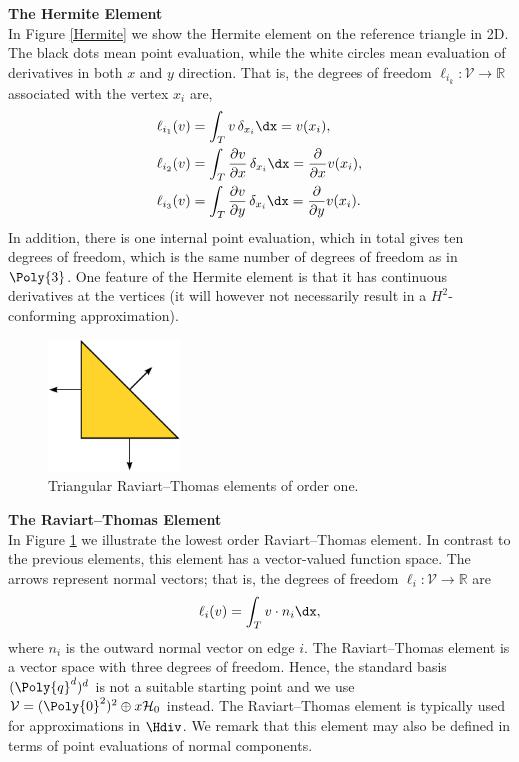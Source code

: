 \begin{example}{\bf{ The Hermite Element}} \\
In Figure \ref{Hermite} we show the Hermite element on the reference
triangle in 2D. The black dots mean point evaluation, while the white
circles mean evaluation of derivatives in both $x$ and $y$ direction.
That is, the degrees of freedom $\ell_{i_k} : \mathcal{V} \rightarrow
\mathbb{R}$ associated with the vertex $x_i$ are,
\begin{align}
\ell_{i_1} (v) &= \int_{T} {v} \, \delta_{x_i} \dx = v(x_i),    \\
\ell_{i_2} (v) &= \int_{T} \frac{\partial{v}}{\partial x} \, \delta_{x_i} \dx = \frac{\partial}{\partial x} v(x_i),  \\
\ell_{i_3} (v) &= \int_{T} \frac{\partial{v}}{\partial y} \, \delta_{x_i} \dx = \frac{\partial}{\partial y} v(x_i).
\end{align}
In addition, there is one internal point evaluation, which in total gives
ten degrees of freedom, which is the same number of degrees of freedom as
in $\Poly{3}$.  One feature of the Hermite element is that it has continuous
derivatives at the vertices (it will however not necessarily result in
a $H^2$-conforming approximation).
\end{example}

\begin{figure}
  \begin{center}
    \includegraphics[height=3.5cm]{chapters/kirby-6/pdf/RT0.pdf}
    \caption{Triangular Raviart--Thomas elements of order one.}
    \label{RaviartThomas}
  \end{center}
\end{figure}

\begin{example}{\bf{The Raviart--Thomas Element}} \\
In Figure \ref{RaviartThomas} we illustrate the lowest order
Raviart--Thomas element.  In contrast to the previous elements, this
element has a vector-valued function space.  The arrows represent normal
vectors; that is, the degrees of freedom $\ell_i : \mathcal{V} \rightarrow
\mathbb{R}$ are
\begin{equation}
\ell_i ( v) = \int_{T} v \cdot n_i  \dx ,
\end{equation}
where $n_i$ is the outward normal vector on edge $i$.  The Raviart--Thomas
element is a vector space with three degrees of freedom. Hence, the
standard basis $(\Poly{q}^d)^d$ is not a suitable starting point and we use
$\mathcal{V} = (\Poly{0}^2)^2 \oplus x \H_0$ instead.  The Raviart--Thomas
element is typically used for approximations in $\Hdiv$.  We remark
that this element may also be defined in terms of point evaluations of
normal components.
\end{example}

